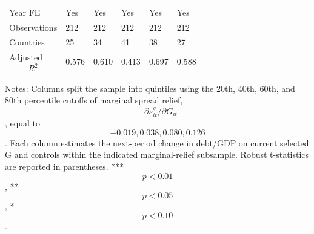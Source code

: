 \begin{table}[H]
\begin{threeparttable}
\begin{tabularx}{\textwidth}{lYYYYY}
Year FE & Yes & Yes & Yes & Yes & Yes \\
Observations & 212 & 212 & 212 & 212 & 212 \\
Countries & 25 & 34 & 41 & 38 & 27 \\
Adjusted $$R^2$$ & 0.576 & 0.610 & 0.413 & 0.697 & 0.588 \\
\bottomrule
\end{tabularx}
\begin{tablenotes}[flushleft]\footnotesize
\item Notes: Columns split the sample into quintiles using the 20th, 40th, 60th, and 80th percentile cutoffs of marginal spread relief, $$-\partial s^g_{it}/\partial G_{it}$$, equal to $$-0.019, 0.038, 0.080, 0.126$$. Each column estimates the next-period change in debt/GDP on current selected G and controls within the indicated marginal-relief subsample. Robust t-statistics are reported in parentheses. *** $$p<0.01$$, ** $$p<0.05$$, * $$p<0.10$$.
\end{tablenotes}
\end{threeparttable}
\end{table}

